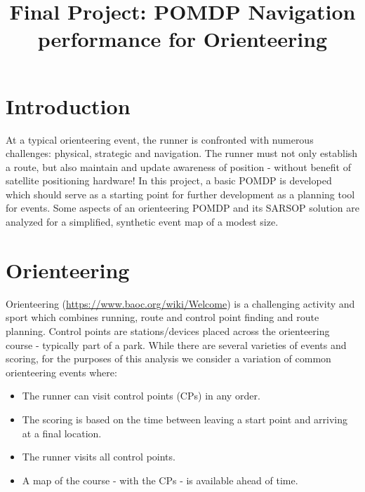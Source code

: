 \documentclass[twoside,11pt]{article}
\begin{document}
\title{Final Project: POMDP Navigation performance for Orienteering}


\maketitle

\section{Introduction}
At a typical orienteering event, the runner is confronted with numerous challenges: physical, strategic and navigation. The runner must not only establish a route, but also maintain and update awareness of position - without benefit of satellite positioning hardware! In this project, a basic POMDP is developed which should serve as a starting point for further development as a planning tool for events. Some aspects of an orienteering POMDP and its SARSOP solution are analyzed for a simplified, synthetic event map of a modest size.

\section{Orienteering}

Orienteering (\url{https://www.baoc.org/wiki/Welcome}) is a challenging activity and sport which combines running, route and control point finding and route planning. Control points are stations/devices placed across the orienteering course - typically part of a park. While there are several varieties of events and scoring, for the purposes of this analysis we consider a variation of common orienteering events where:

\begin{itemize}
\item The runner can visit control points (CPs) in any order.
\item The scoring is based on the time between leaving a start point and arriving at a final location.
\item The runner visits all control points.
\item A map of the course - with the CPs - is available ahead of time.
\end{itemize}
\end{document}
